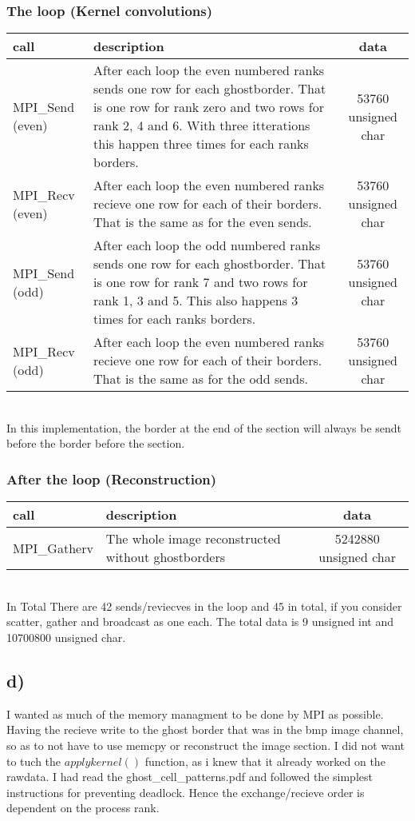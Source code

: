 \documentclass{article}
\begin{document}
\subsubsection*{The loop (Kernel convolutions)}
\begin{tabular}{l|p{200px}|c|}
	call & description & data \\
	\hline
	MPI\_Send (even) & After each loop the even numbered ranks sends one row for each ghostborder. That is one row for rank zero and two rows for rank 2, 4 and 6. With three itterations this happen three times for each ranks borders. & 53760 unsigned char \\
	\hline
	MPI\_Recv (even) & After each loop the even numbered ranks recieve one row for each of their borders. That is the same as for the even sends. & 53760 unsigned char \\	
	\hline
	MPI\_Send (odd) & After each loop the odd numbered ranks sends one row for each ghostborder. That is one row for rank 7 and two rows for rank 1, 3 and 5. This also happens 3 times for each ranks borders. & 53760 unsigned char \\
	\hline
	MPI\_Recv (odd) & After each loop the even numbered ranks recieve one row for each of their borders. That is the same as for the odd sends. & 53760 unsigned char \\
\end{tabular} \\

In this implementation, the border at the end of the section will always be sendt before the border before the section.

\subsubsection*{After the loop (Reconstruction)}
\begin{tabular}{l|p{200px}|c|}
	call & description & data \\
	\hline

	MPI\_Gatherv & The whole image reconstructed without ghostborders & 5242880 unsigned char \\
\end{tabular} \\

In Total There are 42 sends/reviecves in the loop and 45 in total, if you consider scatter, gather and broadcast as one each. The total data is 9 unsigned int and 10700800 unsigned char.

\subsection*{d)}
I wanted as much of the memory managment to be done by MPI as possible. Having the recieve write to the ghost border that was in the bmp image channel, so as to not have to use memcpy or reconstruct the image section. I did not want to tuch the $applykernel()$ function, as i knew that it already worked on the rawdata. I had read the ghost\_cell\_patterns.pdf and followed the simplest instructions for preventing deadlock. Hence the exchange/recieve order is dependent on the process rank.
\end{document}
